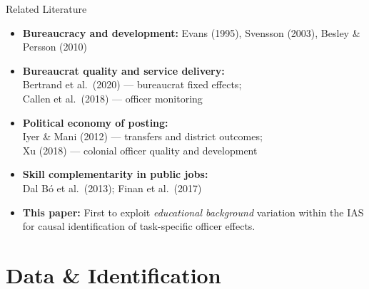 \documentclass[aspectratio=169,10pt]{beamer}
\begin{document}
\begin{frame}{Related Literature}
  \begin{itemize}\setlength\itemsep{6pt}
    \item \textbf{Bureaucracy and development:} Evans (1995),
          Svensson (2003), Besley \& Persson (2010)
    \item \textbf{Bureaucrat quality and service delivery:}\\
          Bertrand et al.\ (2020) — bureaucrat fixed effects;\\
          Callen et al.\ (2018) — officer monitoring
    \item \textbf{Political economy of posting:}\\
          Iyer \& Mani (2012) — transfers and district outcomes;\\
          Xu (2018) — colonial officer quality and development
    \item \textbf{Skill complementarity in public jobs:}\\
          Dal B\'o et al.\ (2013); Finan et al.\ (2017)
    \item \textbf{This paper:} First to exploit \emph{educational background}
          variation within the IAS for causal identification of task-specific
          officer effects.
  \end{itemize}
\end{frame}

\section{Data \& Identification}
\end{document}
